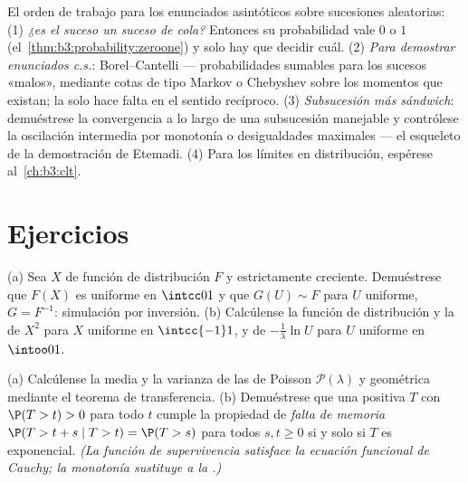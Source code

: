\begin{method}\label{met:b3:probability:toolkit}
El orden de trabajo para los enunciados asintóticos sobre sucesiones
aleatorias: (1) \emph{¿es el suceso un suceso de cola?} Entonces su
probabilidad vale $0$ o $1$ (el~\cref{thm:b3:probability:zeroone}) y
solo hay que decidir cuál. (2) \emph{Para demostrar enunciados c.s.}:
Borel--Cantelli --- probabilidades sumables para los sucesos «malos»,
mediante cotas de tipo Markov o Chebyshev sobre los momentos que
existan; la  solo
hace falta en el sentido recíproco. (3) \emph{Subsucesión más sándwich}:
demuéstrese la convergencia a lo largo de una subsucesión manejable y
contrólese la oscilación intermedia por monotonía o desigualdades
maximales --- el esqueleto de la demostración de Etemadi. (4) Para los
límites en distribución, espérese al~\cref{ch:b3:clt}.
\end{method}

\section{Ejercicios}

\begin{exercise}[$\star$]\label{exo:b3:probability:1}
(a) Sea $X$ de función de distribución $F$
 y estrictamente creciente.
Demuéstrese que $F(X)$ es uniforme en $\intcc01$ y que $G(U) \sim F$
para $U$ uniforme, $G = F^{-1}$: simulación por inversión. (b)
Calcúlense la función de distribución y la
 de $X^2$ para $X$ uniforme en
$\intcc{-1}1$, y de $-\frac1\lambda\ln
U$ para $U$ uniforme en $\intoo01$.
\end{exercise}

\begin{exercise}[$\star$]\label{exo:b3:probability:2}
(a) Calcúlense la media y la varianza de las
 de Poisson $\mathcal
P(\lambda)$ y geométrica mediante el teorema de transferencia. (b)
Demuéstrese que una  positiva $T$ con $\P(T > t)
> 0$ para todo $t$ cumple la propiedad de \emph{falta de memoria}
$\P(T > t + s \mid
T > t) = \P(T > s)$ para todos $s, t \geq 0$ si y solo si $T$ es
exponencial. \emph{(La función de supervivencia satisface la ecuación
funcional de Cauchy; la monotonía sustituye a la
.)}
\end{exercise}


